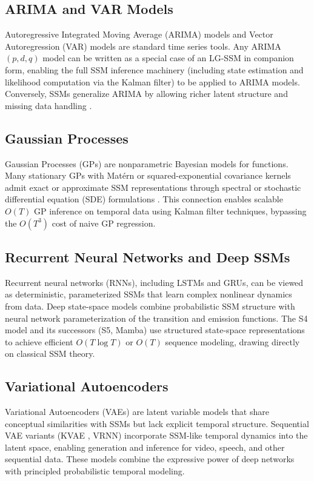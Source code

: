 \documentclass[conference]{IEEEtran}
\begin{document}
\subsection{ARIMA and VAR Models}

Autoregressive Integrated Moving Average (ARIMA) models and Vector Autoregression (VAR) models are standard time series tools. Any ARIMA$(p, d, q)$ model can be written as a special case of an LG-SSM in companion form, enabling the full SSM inference machinery (including state estimation and likelihood computation via the Kalman filter) to be applied to ARIMA models. Conversely, SSMs generalize ARIMA by allowing richer latent structure and missing data handling \cite{harvey1990forecasting}.

\subsection{Gaussian Processes}

Gaussian Processes (GPs) are nonparametric Bayesian models for functions. Many stationary GPs with Mat\'{e}rn or squared-exponential covariance kernels admit exact or approximate SSM representations through spectral or stochastic differential equation (SDE) formulations \cite{solin2014explicit}. This connection enables scalable $O(T)$ GP inference on temporal data using Kalman filter techniques, bypassing the $O(T^3)$ cost of naive GP regression.

\subsection{Recurrent Neural Networks and Deep SSMs}

Recurrent neural networks (RNNs), including LSTMs and GRUs, can be viewed as deterministic, parameterized SSMs that learn complex nonlinear dynamics from data. Deep state-space models \cite{rangapuram2018deep} combine probabilistic SSM structure with neural network parameterization of the transition and emission functions. The S4 model \cite{gu2021efficiently} and its successors (S5, Mamba) use structured state-space representations to achieve efficient $O(T \log T)$ or $O(T)$ sequence modeling, drawing directly on classical SSM theory.

\subsection{Variational Autoencoders}

Variational Autoencoders (VAEs) \cite{kingma2013auto} are latent variable models that share conceptual similarities with SSMs but lack explicit temporal structure. Sequential VAE variants (KVAE \cite{fraccaro2017disentangled}, VRNN) incorporate SSM-like temporal dynamics into the latent space, enabling generation and inference for video, speech, and other sequential data. These models combine the expressive power of deep networks with principled probabilistic temporal modeling.
\end{document}
